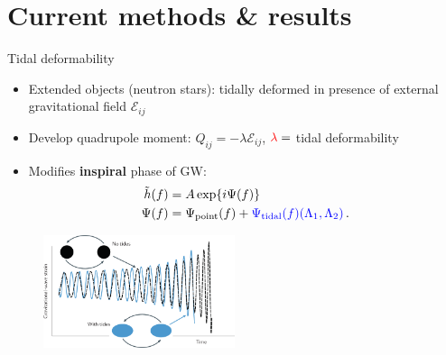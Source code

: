 \documentclass[usenames,dvipsnames,t]{beamer}
\begin{document}
\section{Current methods \& results}

\begin{frame}{Tidal deformability}

  \def\x{3mm}

  \begin{itemize}
    \item Extended objects (neutron stars): tidally deformed in presence of external gravitational field $\mathcal{E}_{ij}$
    
    \vspace{\x}

    \item Develop quadrupole moment: $Q_{ij} = - \lambda \mathcal{E}_{ij}$, $\textcolor{red}{\lambda} =$ tidal deformability
    
    \vspace{\x}

    \item Modifies \textbf{inspiral} phase of GW: 
    \begin{align*}
      \tilde{h}(f) &= A \exp{i \Psi(f)} \\ 
      \Psi(f) &= \Psi_{\text{point}}(f) + \textcolor{blue}{\Psi_{\text{tidal}}(f)(\Lambda_1, \Lambda_2)} \, .
    \end{align*}

  \end{itemize}

  \begin{figure}[H]
    \centering
    \includegraphics[width=0.5\textwidth]{Figures/tidal-deformations.png}
  \end{figure}
\end{frame}
\end{document}
